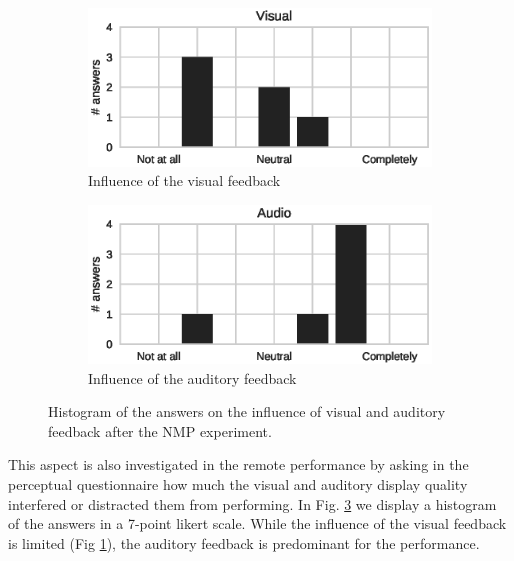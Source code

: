 \documentclass[conference]{IEEEtran}
\begin{document}
\begin{figure}[b]
	\centering
	\begin{subfigure}[t]{.48\columnwidth}
		\centering        
		\includegraphics[trim={.5cm 0cm 1cm 0cm},clip,width=\textwidth]{img/Visual}
		\caption{Influence of the visual feedback}
		\label{subfig:visual}
	\end{subfigure}
	\begin{subfigure}[t]{.48\columnwidth}
		\centering        
		\includegraphics[trim={1.5cm 0cm 0cm 0cm},clip,width=\textwidth]{img/Audio}
		\caption{Influence of the auditory feedback}
		\label{subfig:audio}
	\end{subfigure}
	\quad 
	\caption{Histogram of the answers on the influence of visual and auditory feedback after the NMP experiment.}\label{fig:va}
\end{figure}  

This aspect is also investigated in the remote performance by asking in the perceptual questionnaire how much the visual and auditory display quality interfered or distracted them from performing. In Fig. \ref{fig:va} we display a histogram of the answers in a 7-point likert scale. While the influence of the visual feedback is limited (Fig \ref{subfig:visual}), the auditory feedback is predominant for the performance.
\end{document}
